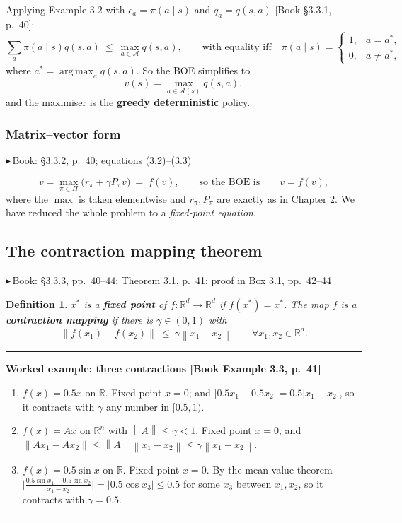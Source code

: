 \documentclass[11pt, letterpaper]{article}
\theoremstyle{runin}
\newtheorem*{definition}{Definition}
\theoremstyle{runinplain}
\theoremstyle{remark}
\newcommand{\R}{\mathbb{R}}
\newcommand{\norm}[1]{\left\lVert #1 \right\rVert}
\newcommand{\abs}[1]{\left\lvert #1 \right\rvert}
\newcommand{\Aspace}{\mathcal{A}}
\newcommand{\argmax}{\operatorname*{arg\,max}}
\newcommand{\bk}[1]{{\color{bookblue}\small$\blacktriangleright$\,\textsf{Book: #1}}}
\newcommand{\bkin}[1]{{\color{bookblue}\small[\textsf{Book #1}]}}
\newenvironment{worked}[1]
  {\par\medskip\noindent\rule{\textwidth}{0.4pt}\par\nobreak\vspace{0.3em}
   \noindent\textbf{Worked example: #1}\par\nobreak\vspace{0.2em}\small}
  {\par\nobreak\vspace{0.3em}\noindent\rule{\textwidth}{0.4pt}\par\medskip}
\begin{document}
Applying Example 3.2 with $c_a=\pi(a\mid s)$ and $q_a=q(s,a)$ \bkin{\S3.3.1, p.~40}:
\[
  \sum_{a}\pi(a\mid s)q(s,a)\ \le\ \max_{a\in\Aspace}q(s,a),
  \qquad\text{with equality iff}\quad
  \pi(a\mid s)=\begin{cases}1,&a=a^*,\\0,&a\ne a^*,\end{cases}
\]
where $a^*=\argmax_a q(s,a)$. So the BOE simplifies to
\[
  v(s)=\max_{a\in\Aspace(s)}q(s,a),
\]
and the maximiser is the \textbf{greedy deterministic} policy.

\subsubsection{Matrix--vector form}

\bk{\S3.3.2, p.~40; equations (3.2)--(3.3)}

\[
  v=\max_{\pi\in\Pi}\bigl(r_\pi+\gamma P_\pi v\bigr)\ \doteq\ f(v),
  \qquad\text{so the BOE is}\qquad v=f(v),
\]
where the $\max$ is taken elementwise and $r_\pi,P_\pi$ are exactly as in
Chapter 2. We have reduced the whole problem to a \emph{fixed-point equation}.

\subsection{The contraction mapping theorem}

\bk{\S3.3.3, pp.~40--44; Theorem 3.1, p.~41; proof in Box 3.1, pp.~42--44}

\begin{definition}
$x^*$ is a \textbf{fixed point} of $f:\R^d\to\R^d$ if $f(x^*)=x^*$. The map $f$ is
a \textbf{contraction mapping} if there is $\gamma\in(0,1)$ with
\[
  \norm{f(x_1)-f(x_2)}\ \le\ \gamma\norm{x_1-x_2}\qquad\forall x_1,x_2\in\R^d .
\]
\end{definition}

\begin{worked}{three contractions \bkin{Example 3.3, p.~41}}
\begin{enumerate}
  \item $f(x)=0.5x$ on $\R$. Fixed point $x=0$; and
        $\abs{0.5x_1-0.5x_2}=0.5\abs{x_1-x_2}$, so it contracts with
        $\gamma$ any number in $[0.5,1)$.
  \item $f(x)=Ax$ on $\R^n$ with $\norm{A}\le\gamma<1$. Fixed point $x=0$, and
        $\norm{Ax_1-Ax_2}\le\norm{A}\norm{x_1-x_2}\le\gamma\norm{x_1-x_2}$.
  \item $f(x)=0.5\sin x$ on $\R$. Fixed point $x=0$. By the mean value theorem
        $\bigl|\frac{0.5\sin x_1-0.5\sin x_2}{x_1-x_2}\bigr|=\abs{0.5\cos x_3}\le0.5$
        for some $x_3$ between $x_1,x_2$, so it contracts with $\gamma=0.5$.
\end{enumerate}
\end{worked}
\end{document}
